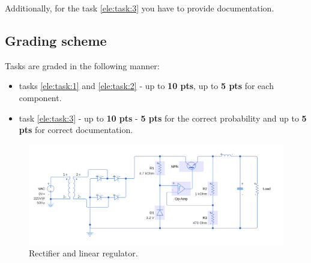 \documentclass[a4paper]{article}
\begin{document}
Additionally, for the task \ref{ele:task:3} you have to provide documentation.

\subsection{Grading scheme}
Tasks are graded in the following manner:
\begin{itemize}
\item tasks \ref{ele:task:1} and \ref{ele:task:2} - up to \textbf{10 pts}, 
up to \textbf{5 pts} for each component.
\item task \ref{ele:task:3} - up to \textbf{10 pts} - \textbf{5 pts} for the 
correct probability and up to \textbf{5 pts} for correct documentation.
\end{itemize}



\begin{figure}
\centering
\includegraphics[width=\linewidth]{images/reg.png}
\caption{Rectifier and linear regulator.}
\end{figure}


 
\end{document}
